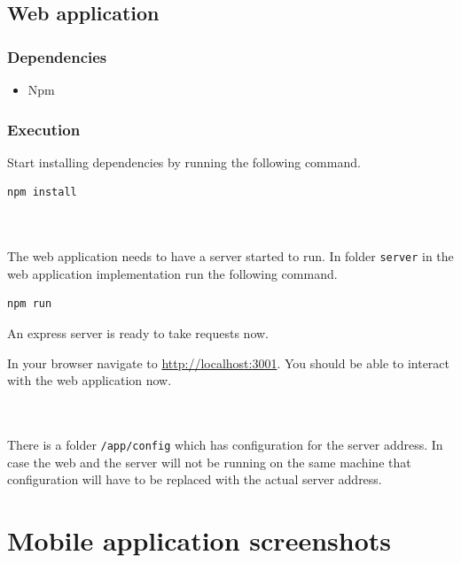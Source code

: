 \documentclass[thesis=M,english]{FITthesis}[2012/10/20]
\begin{document}
\section{Web application}

\subsection{Dependencies}
\begin{itemize}
  \item Npm
\end{itemize}

\subsection{Execution}
\noindent
Start installing dependencies by running the following command.
\begin{lstlisting}[language=C, style=nonumbers]
 npm install
\end{lstlisting}

\\~\\
\noindent The web application needs to have a server started to run. In folder \verb|server| in the web application implementation run the following command.
\begin{lstlisting}[language=C, style=nonumbers]
 npm run
\end{lstlisting}
\noindent An express server is ready to take requests now. 

\noindent In your browser navigate to \url{http://localhost:3001}. You should be able to interact with the web application now.

\\~\\
\noindent There is a folder \verb|/app/config| which has configuration for the server address. In case the web and the server will not be running on the same machine that configuration will have to be replaced with the actual server address.

\chapter{Mobile application screenshots}
\end{document}
